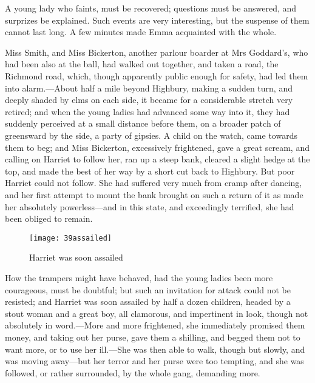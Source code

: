 A young lady who faints, must be recovered; questions must be answered, and surprizes be explained. Such events are very interesting, but the suspense of them cannot last long. A few minutes made Emma acquainted with the whole.

Miss Smith, and Miss Bickerton, another parlour boarder at Mrs Goddard's, who had been also at the ball, had walked out together, and taken a road, the Richmond road, which, though apparently public enough for safety, had led them into alarm.—About half a mile beyond Highbury, making a sudden turn, and deeply shaded by elms on each side, it became for a considerable stretch very retired; and when the young ladies had advanced some way into it, they had suddenly perceived at a small distance before them, on a broader patch of greensward by the side, a party of gipsies. A child on the watch, came towards them to beg; and Miss Bickerton, excessively frightened, gave a great scream, and calling on Harriet to follow her, ran up a steep bank, cleared a slight hedge at the top, and made the best of her way by a short cut back to Highbury. But poor Harriet could not follow. She had suffered very much from cramp after dancing, and her first attempt to mount the bank brought on such a return of it as made her absolutely powerless—and in this state, and exceedingly terrified, she had been obliged to remain.

\begin{figure}[tbph]
\centering
\texttt{[image: 39assailed]}
\caption{Harriet was soon assailed}
\end{figure}

How the trampers might have behaved, had the young ladies been more courageous, must be doubtful; but such an invitation for attack could not be resisted; and Harriet was soon assailed by half a dozen children, headed by a stout woman and a great boy, all clamorous, and impertinent in look, though not absolutely in word.—More and more frightened, she immediately promised them money, and taking out her purse, gave them a shilling, and begged them not to want more, or to use her ill.—She was then able to walk, though but slowly, and was moving away—but her terror and her purse were too tempting, and she was followed, or rather surrounded, by the whole gang, demanding more.

